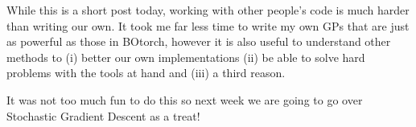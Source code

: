 \documentclass[12pt]{article}
\begin{document}
\vspace{5mm}

While this is a short post today, working with other people's code is much harder than writing our own. It took me far less time to write my own GPs that are just as powerful as those in BOtorch, however it is also useful to understand other methods to (i) better our own implementations (ii) be able to solve hard problems with the tools at hand and (iii) a third reason.

\vspace{5mm}

It was not too much fun to do this so next week we are going to go over Stochastic Gradient Descent as a treat!
\end{document}
